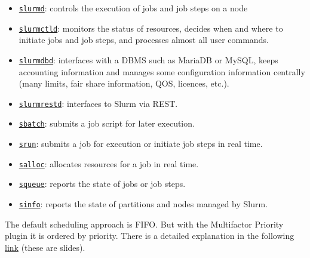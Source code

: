 \begin{itemize}
    \item \href{https://slurm.schedmd.com/slurmd.html}{\texttt{slurmd}}: controls the execution of jobs and job steps on a node

    \item \href{https://slurm.schedmd.com/slurmctld.html}{\texttt{slurmctld}}: monitors the status of resources, decides when and where to initiate jobs and job steps, and processes almost all user commands.

    \item \href{https://slurm.schedmd.com/slurmdbd.html}{\texttt{slurmdbd}}: interfaces with a DBMS such as MariaDB or MySQL, keeps accounting information and manages some configuration information centrally (many limits, fair share information, QOS, licences, etc.).

    \item \href{https://slurm.schedmd.com/slurmrestd.html}{\texttt{slurmrestd}}: interfaces to Slurm via REST.

    \item \href{https://slurm.schedmd.com/sbatch.html}{\texttt{sbatch}}: submits a job script for later execution.

    \item \href{https://slurm.schedmd.com/srun.html}{\texttt{srun}}: submits a job for execution or initiate job steps in real time.

    \item \href{https://slurm.schedmd.com/salloc.html}{\texttt{salloc}}: allocates resources for a job in real time.

    \item \href{https://slurm.schedmd.com/squeue.html}{\texttt{squeue}}: reports the state of jobs or job steps.

    \item \href{https://slurm.schedmd.com/sinfo.html}{\texttt{sinfo}}: reports the state of partitions and nodes managed by Slurm.
\end{itemize}
The default scheduling approach is FIFO. But with the Multifactor Priority plugin it is ordered by priority. There is a detailed explanation in the following \href{https://mmesiti.github.io/slurmprio200428/}{link} (these are slides).